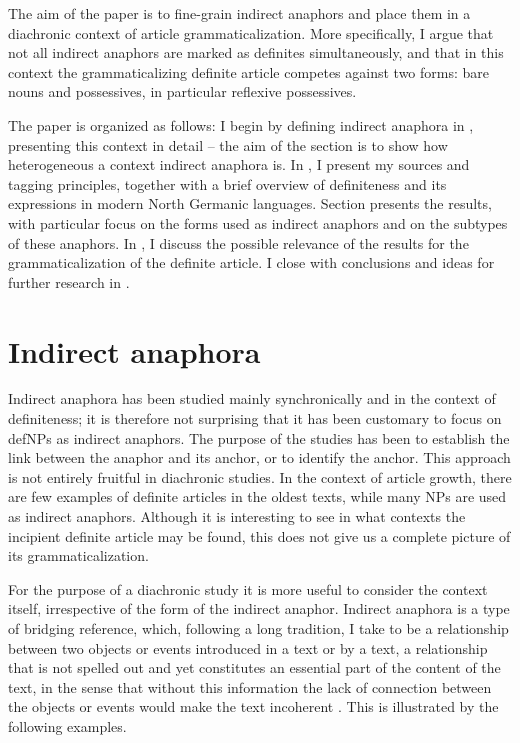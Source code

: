 \documentclass[output=paper]{langsci/langscibook}
\begin{document}
The aim of the paper is to fine-grain indirect anaphors and place them in a diachronic context of article grammaticalization. More specifically, I argue that not all indirect anaphors are marked as definites simultaneously, and that in this context the grammaticalizing definite article competes against two forms: bare nouns and possessives, in particular reflexive possessives. 

The paper is organized as follows: I begin by defining indirect anaphora in , presenting this context in detail -- the aim of the section is to show how heterogeneous a context indirect anaphora is. In , I present my sources and tagging principles, together with a brief overview of definiteness and its expressions in modern North Germanic languages. Section  presents the results, with particular focus on the forms used as indirect anaphors and on the subtypes of these anaphors. In , I discuss the possible relevance of the results for the grammaticalization of the definite article. I close with conclusions and ideas for further research in .


\section{Indirect anaphora}\label{6sec:2}

Indirect anaphora has been studied mainly synchronically and in the context of definiteness; it is therefore not surprising that it has been customary to focus on defNPs as indirect anaphors. The purpose of the studies has been to establish the link between the anaphor and its anchor, or to identify the anchor. This approach is not entirely fruitful in diachronic studies. In the context of article growth, there are few examples of definite articles in the oldest texts, while many NPs are used as indirect anaphors. Although it is interesting to see in what contexts the incipient definite article may be found, this does not give us a complete picture of its grammaticalization. 

For the purpose of a diachronic study it is more useful to consider the context itself, irrespective of the form of the indirect anaphor. Indirect anaphora is a type of bridging reference, which, following a long tradition, I take to be a relationship between two objects or events introduced in a text or by a text, a relationship that is not spelled out and yet constitutes an essential part of the content of the text, in the sense that without this information the lack of connection between the objects or events would make the text incoherent \citep{asher:lascarides:98}. This is illustrated by the following examples. 
\end{document}
